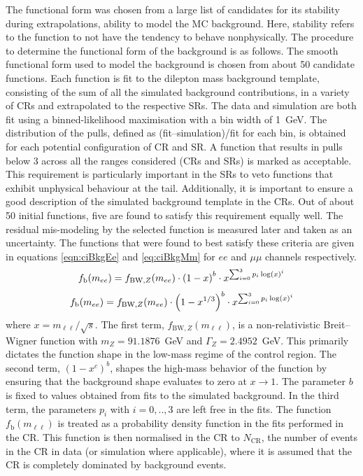 The functional form was chosen from a large list of candidates for its stability during extrapolations, ability to model the MC background. Here, stability refers to the function to not have the tendency to behave nonphysically.
The procedure to determine the functional form of the background is as follows.
The smooth functional form used to model the background is chosen from about 50 candidate functions.
Each function is fit to the dilepton mass background template, consisting of the sum of all the simulated background contributions, in a variety of CRs and extrapolated to the respective SRs.
The data and simulation are both fit using a binned-likelihood maximisation with a bin width of 1~GeV.
The distribution of the pulls, defined as (fit--simulation)/fit for each bin, is obtained for each potential configuration of CR and SR.
A function that results in pulls below 3 across all the ranges considered (CRs and SRs) is marked as acceptable.
This requirement is particularly important in the SRs to veto functions that exhibit unphysical behaviour at the tail.
Additionally, it is important to ensure a good description of the simulated background template in the CRs.
Out of about 50 initial functions, five are found to satisfy this requirement equally well.
The residual mis-modeling by the selected function is measured later and taken as an uncertainty.
The functions that were found to best satisfy these criteria are given in equations \ref{eqn:ciBkgEe} and \ref{eq:ciBkgMm} for $ee$ and $\mu\mu$ channels respectively.
\begin{equation}\begin{split} \label{eqn:ciBkgEe}
f_\textrm{b}(m_{ee}) &= f_{\mathrm{BW},Z}(m_{ee}) \cdot \left(1 - x\right)^{b} \cdot x^{\sum_{i=0}^3 p_i\log(x)^i} \\
\end{split}\end{equation} 
\begin{equation}\begin{split}\label{eqn:ciBkgMm}
f_\textrm{b}(m_{ee}) &= f_{\mathrm{BW},Z}(m_{ee}) \cdot \left(1 - x^{1/3}\right)^{b} \cdot x^{\sum_{i=0}^3 p_i\log(x)^i} \\
\end{split}\end{equation} 
where $x = m_{\ell\ell}/\sqrt{s}$.
The first term, $f_{\mathrm{BW},Z}(m_{\ell\ell})$, is a non-relativistic Breit--Wigner function with $m_Z = 91.1876$~GeV and $\Gamma_Z = 2.4952$~GeV.
This primarily dictates the function shape in the low-mass regime of the control region.
The second term, $(1-x^{c})^{b}$, shapes the high-mass behavior of the function by ensuring that the background shape evaluates to zero at $x\to 1$.
The parameter $b$ is fixed to values obtained from fits to the simulated background.
In the third term, the parameters $p_i$ with $i=0,..,3$ are left free in the fits.
The function $f_\textrm{b}(m_{\ell\ell})$ is treated as a probability density function in the fits performed in the CR.
This function is then normalised in the CR to $N_\textrm{CR}$, the number of events in the CR in data (or simulation where applicable), where it is assumed that the CR is completely dominated by background events.

